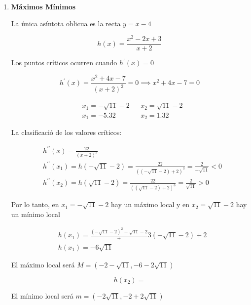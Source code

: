 \begin{example}
\begin{enumerate}
		\item \textbf{Máximos Mínimos}

		      La única asíntota oblicua es la recta $y=x-4$

		      \begin{equation*}
			      h(x)= \frac{x^2-2x+3}{x+2}
		      \end{equation*}

		      Los puntos críticos ocurren cuando $h^{\prime}(x)=0$

		      \begin{equation*}
			      h^{\prime}(x)=\frac{x^2+4x-7}{\left(x+2\right)^2}=0\implies x^2+4x-7=0
		      \end{equation*}

		      \begin{align*}
			       & x_1=-\sqrt{11}-2 &  & x_2=\sqrt{11}-2 \\
			       & x_1=-5.32        &  & x_2=1.32
		      \end{align*}

		      La clasificació de los valores críticos:

		      \begin{align*}
			       & h^{\prime\prime}(x)= \frac{22}{\left(x+2\right)^3}                                                                 \\
			       & h^{\prime\prime}(x_1)=h(-\sqrt{11}-2)=\frac{22}{\left(\left(-\sqrt{11}-2\right)+2\right)^3}=\frac{2}{-\sqrt{11}}<0 \\
			       & h^{\prime\prime}(x_2)=h(\sqrt{11}-2)=\frac{22}{\left(\left(\sqrt{11}-2\right)+2\right)^3}=\frac{2}{\sqrt{11}}>0
		      \end{align*}

		      Por lo tanto, en $x_1=-\sqrt{11}-2$ hay un máximo local y en $x_2=\sqrt{11}-2$ hay un mínimo local

		      \begin{align*}
			       & h(x_1)=\frac{\left(-\sqrt{11}-2\right)^2-\sqrt{11}-2}+3{\left(-\sqrt{11}-2\right)+2} \\
			       & h(x_1)=-6\sqrt{11}
		      \end{align*}

		      El máximo local será $M=\left(-2-\sqrt{11},-6-2\sqrt{11}\right)$

		      \begin{equation*}
			      h(x_2)=
		      \end{equation*}

		      El mínimo local será $m=\left(-2\sqrt{11}, -2+2\sqrt{11}\right)$


\end{enumerate}
\end{example}
